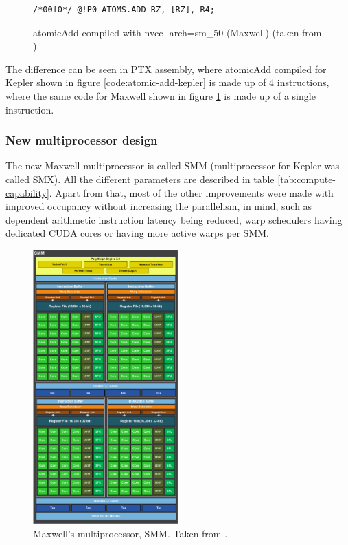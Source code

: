 \begin{figure}
\begin{verbatim}
/*00f0*/ @!P0 ATOMS.ADD RZ, [RZ], R4;                                 
\end{verbatim}
\caption{atomicAdd compiled with nvcc -arch=sm\_50 (Maxwell) (taken from \cite{first-experience-maxwell})} 
\label{code:atomic-add-maxwell}
\end{figure}

The difference can be seen in PTX assembly, where atomicAdd compiled for Kepler shown in figure \ref{code:atomic-add-kepler} is made up of 4 instructions, where the same code for Maxwell shown in figure \ref{code:atomic-add-maxwell} is made up of a single instruction.

\subsubsection{New multiprocessor design} \label{subsubsec:cuda-new-multip}

The new Maxwell multiprocessor is called SMM (multiprocessor for Kepler was called SMX). All the different parameters are described in table \ref{tab:compute-capability}. Apart from that, most of the other improvements were made with improved occupancy without increasing the parallelism, in mind, such as dependent arithmetic instruction latency being reduced, warp schedulers having dedicated CUDA cores or having more active warps per SMM.

\begin{center}
\begin{figure}[ht]
	\centering\includegraphics[width=0.50\textwidth]{fig/smm.png}
	\caption{Maxwell's multiprocessor, SMM.	Taken from \cite{maxwell-whitepaper}.}\label{fig:smm}
\end{figure}
\end{center}

